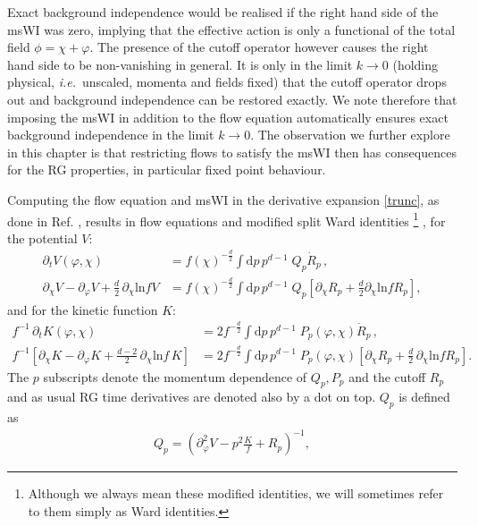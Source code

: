 \documentclass[11pt]{book} %
\newcommand\ie{\textit{i.e.}\ }
\newcommand{\vp}{\varphi}
\numberwithin{equation}{chapter}
\begin{document}
Exact background independence would be realised if the right hand side of the msWI was zero,
implying that the effective action is only a functional of the total field $\phi = \chi + \vp$.
The presence of the cutoff operator however causes the right hand side to be non-vanishing in general.
It is only in the limit $k\rightarrow0$ (holding physical, \ie unscaled,
momenta and fields fixed) that the cutoff operator drops out and background independence can be
restored exactly. We note therefore that imposing the msWI in addition to the flow equation
automatically ensures exact background independence in the limit $k\rightarrow0$.
The observation we further explore in this chapter is that restricting flows to
satisfy the msWI then has consequences for the RG properties,
in particular fixed point behaviour.

Computing the flow equation and msWI in the derivative expansion \eqref{trunc}, as done
in Ref. \cite{Dietz:2015owa}, results in flow equations
and modified split Ward identities%
\footnote{
  Although we always mean these modified identities,
  we will sometimes refer to them  simply as Ward identities.
}%
, for the potential $V$:
\begin{align}
  \label{flowV}
  \partial_t V(\varphi,\chi)
  &= f(\chi)^{-\frac{d}{2}} \int \mathrm dp\, p^{d-1} \; Q_p \dot R_p \,, \\
  \label{msWIV}
  \partial_\chi V - \partial_\varphi V + \frac{d}{2} \, \partial_\chi \text{ln} f V
  &= f(\chi)^{-\frac{d}{2}} \int \mathrm dp\, p^{d-1} \; Q_p
  \left[
    \partial_\chi R_p + \frac{d}{2}\partial_\chi \text{ln} f  R_p
  \right] ,
\end{align}
and for the kinetic function $K$:
\begin{align}
  \label{flowK}
  f^{-1} \, \partial_t K(\varphi,\chi)
  &= 2 f^{-\frac{d}{2}} \int \mathrm dp \, p^{d-1} \; P_p(\varphi,\chi)\dot R_p \,,\\
  \label{msWIK}
  f^{-1}
  \left[
    \partial_\chi K- \partial_\varphi K + \frac{d-2}{2} \, \partial_\chi \text{ln}f \, K
  \right]
  &= 2 f^{-\frac{d}{2}} \int \mathrm dp \, p^{d-1} \; P_p(\varphi,\chi)
  \left[
    \partial_{\chi} R_p + \frac{d}{2} \, \partial_\chi \mathrm{ln} f R_p
  \right].
\end{align}
The $p$ subscripts denote the momentum dependence of $Q_p, P_p$ and the cutoff $R_p$ and as
usual RG time derivatives are denoted also by a dot on top. $Q_p$ is defined as
\begin{align}
	Q_p = \left( \partial^2_\varphi V - p^2\frac{K}{f} + R_p \right)^{-1} ,
	\label{Q}
\end{align}
\end{document}

